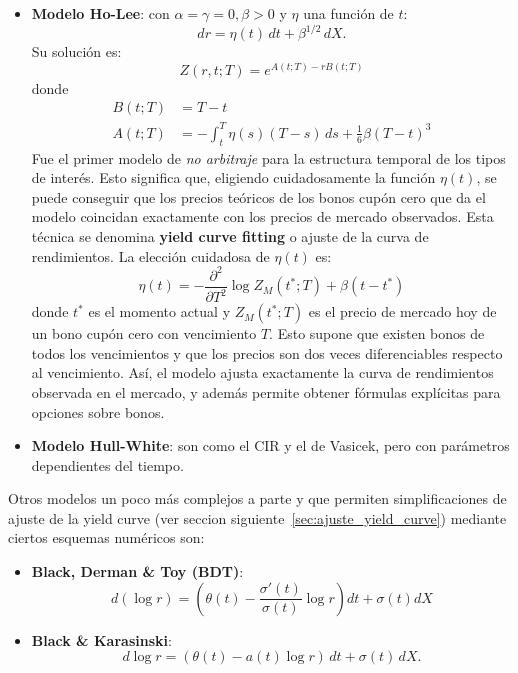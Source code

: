 \begin{itemize}
    \item \textbf{Modelo Ho-Lee}: con $\alpha=\gamma=0, \beta>0$ y $\eta$ una función de $t$:
    \begin{equation*}
        \boxed{dr = \eta(t)\,dt + \beta^{1/2}\,dX.}
    \end{equation*}
    Su solución es:
    \begin{equation*}
        Z(r, t; T) = e^{A(t;T) - r B(t;T)}
    \end{equation*}
    donde
    \begin{align*}
        B(t;T) &= T - t \\
        A(t;T) &= -\int_t^T \eta(s)(T-s)\,ds + \frac{1}{6} \beta (T-t)^3
    \end{align*}
    Fue el primer modelo de \textit{no arbitraje} para la estructura temporal de los tipos de interés. Esto significa que, eligiendo cuidadosamente la función $\eta(t)$, se puede conseguir que los precios teóricos de los bonos cupón cero que da el modelo coincidan exactamente con los precios de mercado observados. Esta técnica se denomina \textbf{yield curve fitting} o ajuste de la curva de rendimientos.
    La elección cuidadosa de $\eta(t)$ es:
    \begin{equation*}
        \eta(t) = -\frac{\partial^2}{\partial T^2} \log Z_M(t^*; T) + \beta (t - t^*)
    \end{equation*}
    donde $t^*$ es el momento actual y $Z_M(t^*; T)$ es el precio de mercado hoy de un bono cupón cero con vencimiento $T$. Esto supone que existen bonos de todos los vencimientos y que los precios son dos veces diferenciables respecto al vencimiento. Así, el modelo ajusta exactamente la curva de rendimientos observada en el mercado, y además permite obtener fórmulas explícitas para opciones sobre bonos.

    \item \textbf{Modelo Hull-White}: son como el CIR y el de Vasicek, pero con parámetros dependientes del tiempo.
\end{itemize}

Otros modelos un poco más complejos a parte y que permiten simplificaciones de ajuste de la yield curve (ver seccion siguiente~\ref{sec:ajuste_yield_curve}) mediante ciertos esquemas numéricos son:
\begin{itemize}
    \item \textbf{Black, Derman \& Toy (BDT)}:
    \begin{equation*}
        d(\log r) = \left( \theta(t) - \frac{\sigma'(t)}{\sigma(t)} \log r \right) dt + \sigma(t) dX
    \end{equation*}

    \item \textbf{Black \& Karasinski}:
    \begin{equation*}
        d\log r = (\theta(t) - a(t)\log r)\,dt + \sigma(t)\,dX.
    \end{equation*}
\end{itemize}









